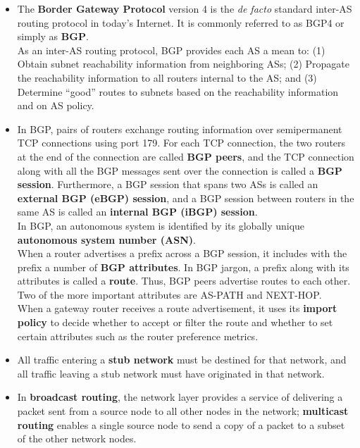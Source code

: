 \begin{itemize}
\item
The \textbf{Border Gateway Protocol} version 4 is the \textit{de facto} standard inter-AS routing protocol in today's Internet. It is commonly referred to as BGP4 or simply as \textbf{BGP}.\\
As an inter-AS routing protocol, BGP provides each AS a mean to: (1) Obtain subnet reachability information from neighboring ASs; (2) Propagate the reachability information to all routers internal to the AS; and (3) Determine ``good'' routes to subnets based on the reachability information and on AS policy.\\

\item
In BGP, pairs of routers exchange routing information over semipermanent TCP connections using port 179. For each TCP connection, the two routers at the end of the connection are called \textbf{BGP peers}, and the TCP connection along with all the BGP messages sent over the connection is called a \textbf{BGP session}. Furthermore, a BGP session that spans two ASs is called an \textbf{external BGP (eBGP) session}, and a BGP session between routers in the same AS is called an \textbf{internal BGP (iBGP) session}.\\
In BGP, an autonomous system is identified by its globally unique \textbf{autonomous system number (ASN)}.\\
When a router advertises a prefix across a BGP session, it includes with the prefix a number of \textbf{BGP attributes}. In BGP jargon, a prefix along with its attributes is called a \textbf{route}. Thus, BGP peers advertise routes to each other. Two of the more important attributes are AS-PATH and NEXT-HOP.\\
When a gateway router receives a route advertisement, it uses its \textbf{import policy} to decide whether to accept or filter the route and whether to set certain attributes such as the router preference metrics.

\item
All traffic entering a \textbf{stub network} must be destined for that network, and all traffic leaving a stub network must have originated in that network.

\item
In \textbf{broadcast routing}, the network layer provides a service of delivering a packet sent from a source node to all other nodes in the network; \textbf{multicast routing} enables a single source node to send a copy of a packet to a subset of the other network nodes.


\end{itemize}
